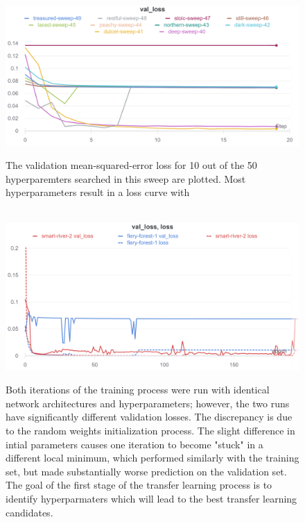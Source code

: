 \begin{figure}
    \centering
    \
    \includegraphics[width=\linewidth]{Chapters/Figures/10-sweep.png}
    \label{fig:meta-1-sweep-loss}
    \caption[Hyperpamater Sweep 1]{The validation mean-squared-error loss for 10 out of the 50 hyperparemters searched in this sweep are plotted. Most hyperparameters result in a loss curve with }
\end{figure}



\begin{figure}
    \centering
    \
    \includegraphics[width=\linewidth]{Chapters/Figures/best-params-meta1.png}
    \label{fig:meta-1-best}
    \caption[Hyperpamater Sweep 1]{Both iterations of the training process were run with identical network architectures and hyperparameters; however, the two runs have significantly different validation losses. The discrepancy is due to the random weights initialization process. The slight difference in intial parameters causes one iteration to become "stuck" in a different local minimum, which performed similarly with the training set, but made substantially worse prediction on the validation set. The goal of the first stage of the transfer learning process is to identify hyperparmaters which will lead to the best transfer learning candidates.}
\end{figure}

